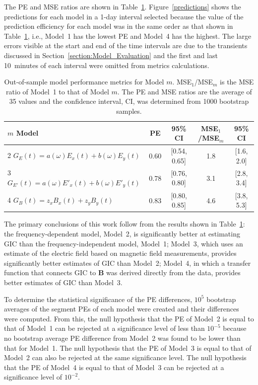 \documentclass[draft,linenumbers]{agujournal2018}
\begin{document}
The PE and MSE ratios are shown in Table~\ref{resultstable}. Figure~\ref{predictions} shows the predictions for each model in a 1-day interval selected because the value of the prediction efficiency for each model was in the same order as that shown in Table~\ref{resultstable}, i.e., Model~1 has the lowest PE and Model~4 has the highest. The large errors visible at the start and end of the time intervals are due to the transients discussed in Section~\ref{section:Model_Evaluation} and the first and last 10~minutes of each interval were omitted from metrics calculations.

\begin{table}
  \caption{Out-of-sample model performance metrics for Model $m$. MSE$_1$/MSE$_m$ is the MSE ratio of Model~1 to that of Model $m$. The PE and MSE ratios are the average of 35 values and the confidence interval, CI, was determined from 1000 bootstrap samples.}
  \centering
  \begin{tabular}{l c c c c}
    \hline
    $m$\hspace{1em} Model & PE & 95\% CI & MSE$_1$/MSE$_m$ & 95\% CI\\
    \hline
    2\hspace{1em} $G_E(t) = a(\omega)E_x(t) + b(\omega)E_y(t)$ & 0.60 & [0.54, 0.65] & 1.8 & [1.6, 2.0]\\
    3\hspace{1em} $G_{E'}(t) = a(\omega)E'_x(t) + b(\omega)E'_y(t)$ & 0.78 & [0.76, 0.80] & 3.1 & [2.8, 3.4]\\
    4\hspace{1em} $G_{B}(t) = z_xB_x(t) + z_yB_y(t)$ & 0.83 & [0.80, 0.85] & 4.6 & [3.8, 5.3]\\
    \hline
  \end{tabular}
  \label{resultstable}
\end{table}

The primary conclusions of this work follow from the results shown in Table~\ref{resultstable}: the frequency-dependent model, Model~2, is significantly better at estimating GIC than the frequency-independent model, Model~1; Model~3, which uses an estimate of the electric field based on magnetic field measurements, provides significantly better estimates of GIC than Model~2; Model~4, in which a transfer function that connects GIC to $\mathbf{B}$ was derived directly from the data, provides better estimates of GIC than Model~3.

To determine the statistical significance of the PE differences, $10^5$ bootstrap averages of the segment PEs of each model were created and their differences were computed. From this, the null hypothesis that the PE of Model~2 is equal to that of Model~1 can be rejected at a significance level of less than $10^{-5}$ because no bootstrap average PE difference from Model~2 was found to be lower than that for Model~1. The null hypothesis that the PE of Model~3 is equal to that of Model~2 can also be rejected at the same significance level. The null hypothesis that the PE of Model~4 is equal to that of Model~3 can be rejected at a significance level of $10^{-2}$.
\end{document}
